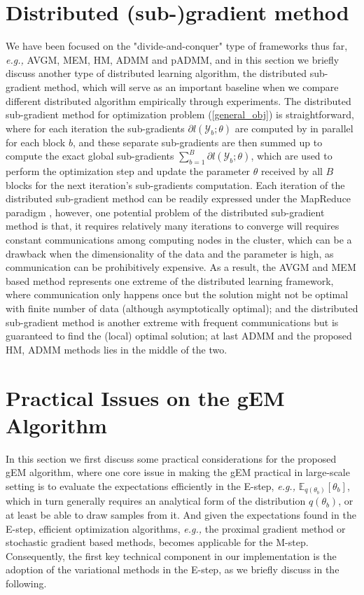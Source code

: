 \documentclass{article}
\newcommand{\eg}[0]{\emph{e.g., }}
\newcommand{\1}[0]{\ensuremath{\boldsymbol{1}}\xspace}
\begin{document}
\section{Distributed (sub-)gradient method}
We have been focused on the "divide-and-conquer" type of frameworks thus far, \eg AVGM, MEM, HM, ADMM and pADMM, and in this section we briefly discuss another type of distributed learning algorithm, the distributed sub-gradient method, which will serve as an important baseline when we compare different distributed algorithm empirically through experiments. The distributed sub-gradient method for optimization problem (\ref{general_obj}) is straightforward, where for each iteration the sub-gradients $\partial l(\mathcal{Y}_b; \theta)$ are computed by in parallel for each block $b$, and these separate sub-gradients are then summed up to compute the exact global sub-gradients $\textstyle\sum_{b=1}^B\partial l(\mathcal{Y}_b; \theta)$, which are used to perform the optimization step and update the parameter $\theta$ received by all $B$ blocks for the next iteration's sub-gradients computation. Each iteration of the distributed sub-gradient method can be readily expressed under the MapReduce paradigm \cite{Dean2004}, however, one potential problem of the distributed sub-gradient method is that, it requires relatively many iterations to converge will requires constant communications among computing nodes in the cluster, which can be a drawback when the dimensionality of the data and the parameter is high, as communication can be prohibitively expensive. As a result, the AVGM and MEM based method represents one extreme of the distributed learning framework, where communication only happens once but the solution might not be optimal with finite number of data (although asymptotically optimal); and the distributed sub-gradient method is another extreme with frequent communications but is guaranteed to find the (local) optimal solution; at last ADMM and the proposed HM, ADMM methods lies in the middle of the two.


\section{Practical Issues on the gEM Algorithm}
In this section we first discuss some practical considerations for the proposed gEM algorithm, where one core issue in making the gEM practical in large-scale setting is to evaluate the expectations efficiently in the E-step, \eg $\mathbb{E}_{q(\theta_b)}[\theta_b]$, which in turn generally requires an analytical form of the distribution $q(\theta_b)$, or at least be able to draw samples from it. And given the expectations found in the E-step, efficient optimization algorithms, \eg the proximal gradient method or stochastic gradient based methods, becomes applicable for the M-step. Consequently, the first key technical component in our implementation is the adoption of the variational methods \cite{Wainwright2008} in the E-step, as we briefly discuss in the following.
\end{document}
